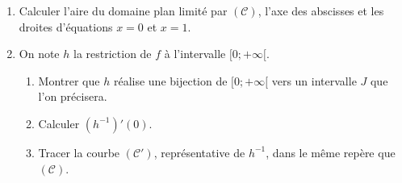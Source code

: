\begin{exo}
\begin{description}
\begin{enumerate}
                        \item Calculer l'aire du domaine plan limit\'e par $(\mathscr{C})$, 
                              l'axe des abscisses et les droites d'\'equations $x=0$ et $x=1$.                                         
                        \item On note $h$ la restriction de $f$ \`a l'intervalle $[0 ; +\infty[$.
                              \begin{enumerate}
                                    \item Montrer que $h$ r\'ealise une bijection de $[0 ; +\infty[$ 
                                          vers un intervalle $J$ que l'on pr\'ecisera.                                                       
                                    \item Calculer $(h^{-1})'(0)$.                                                                          
                                    \item Tracer la courbe $(\mathscr{C}')$, repr\'esentative de $h^{-1}$,
                                          dans le m\^eme rep\`ere que $(\mathscr{C})$.                
                              \end{enumerate}
                  \end{enumerate}
      \end{description}
\end{exo}
